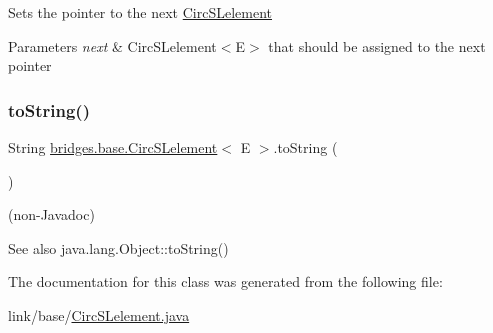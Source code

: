 Sets the pointer to the next \hyperlink{classbridges_1_1base_1_1_circ_s_lelement}{Circ\+S\+Lelement}


\begin{DoxyParams}{Parameters}
{\em next} & Circ\+S\+Lelement$<$\+E$>$ that should be assigned to the next pointer \\
\hline
\end{DoxyParams}
\hypertarget{classbridges_1_1base_1_1_circ_s_lelement_af307188926766e73efb988f102ce9740}{}\label{classbridges_1_1base_1_1_circ_s_lelement_af307188926766e73efb988f102ce9740} 
\subsubsection{\texorpdfstring{to\+String()}{toString()}}
{\footnotesize\ttfamily String \hyperlink{classbridges_1_1base_1_1_circ_s_lelement}{bridges.\+base.\+Circ\+S\+Lelement}$<$ E $>$.to\+String (\begin{DoxyParamCaption}{ }\end{DoxyParamCaption})}

(non-\/\+Javadoc) \begin{DoxySeeAlso}{See also}
java.\+lang.\+Object\+::to\+String() 
\end{DoxySeeAlso}


The documentation for this class was generated from the following file\+:\begin{DoxyCompactItemize}
\item 
link/base/\hyperlink{_circ_s_lelement_8java}{Circ\+S\+Lelement.\+java}\end{DoxyCompactItemize}
